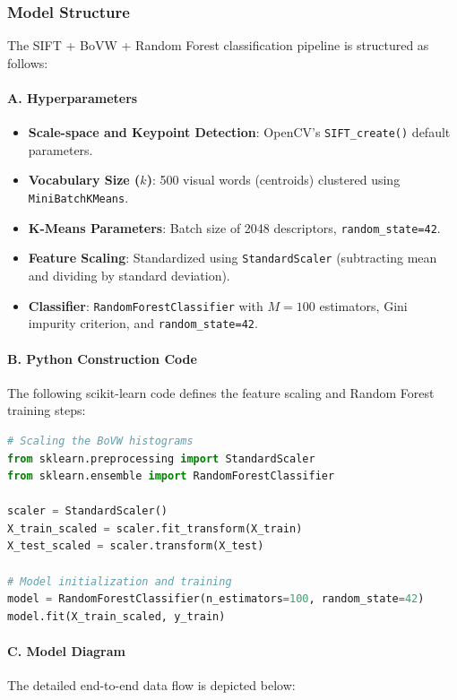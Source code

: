 \documentclass[12pt,a4paper]{article}
\begin{document}
\subsubsection{Model Structure}
The SIFT + BoVW + Random Forest classification pipeline is structured as follows:

\paragraph{A. Hyperparameters}
\begin{itemize}
    \item \textbf{Scale-space and Keypoint Detection}: OpenCV's \texttt{SIFT\_create()} default parameters.
    \item \textbf{Vocabulary Size ($k$)}: 500 visual words (centroids) clustered using \texttt{MiniBatchKMeans}.
    \item \textbf{K-Means Parameters}: Batch size of 2048 descriptors, \texttt{random\_state=42}.
    \item \textbf{Feature Scaling}: Standardized using \texttt{StandardScaler} (subtracting mean and dividing by standard deviation).
    \item \textbf{Classifier}: \texttt{RandomForestClassifier} with $M = 100$ estimators, Gini impurity criterion, and \texttt{random\_state=42}.
\end{itemize}

\paragraph{B. Python Construction Code}
The following scikit-learn code defines the feature scaling and Random Forest training steps:

\begin{lstlisting}[language=Python]
# Scaling the BoVW histograms
from sklearn.preprocessing import StandardScaler
from sklearn.ensemble import RandomForestClassifier

scaler = StandardScaler()
X_train_scaled = scaler.fit_transform(X_train)
X_test_scaled = scaler.transform(X_test)

# Model initialization and training
model = RandomForestClassifier(n_estimators=100, random_state=42)
model.fit(X_train_scaled, y_train)
\end{lstlisting}

\paragraph{C. Model Diagram}
The detailed end-to-end data flow is depicted below:
\end{document}
